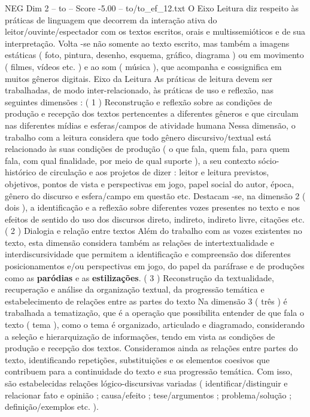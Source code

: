 \begin{textsample}{NEG Dim 2 – to – Score -5.00 – to/to\_ef\_12.txt}  \label{ex:f2_neg_155}
O Eixo Leitura diz respeito às práticas de linguagem que decorrem da interação ativa do leitor/ouvinte/espectador com os textos escritos, orais e multissemióticos e de sua interpretação.
Volta -se não somente ao texto escrito, mas também a imagens estáticas ( foto, pintura, desenho, esquema, gráfico, diagrama ) ou em movimento ( filmes, vídeos etc. ) e ao som ( música ), que acompanha e cossignifica em muitos gêneros digitais.
Eixo da Leitura As práticas de leitura devem ser trabalhadas, de modo inter-relacionado, às práticas de uso e reflexão, nas seguintes dimensões : ( 1 ) Reconstrução e reflexão sobre as condições de produção e recepção dos textos pertencentes a diferentes gêneros e que circulam nas diferentes mídias e esferas/campos de atividade humana Nessa dimensão, o trabalho com a leitura considera que todo gênero discursivo/textual está relacionado às suas condições de produção ( o que fala, quem fala, para quem fala, com qual finalidade, por meio de qual suporte ), a seu contexto sócio-histórico de circulação e aos projetos de dizer : leitor e leitura previstos, objetivos, pontos de vista e perspectivas em jogo, papel social do autor, época, gênero do discurso e esfera/campo em questão etc.
Destacam -se, na dimensão 2 ( dois ), a identificação e a reflexão sobre diferentes vozes presentes no texto e nos efeitos de sentido do uso dos discursos direto, indireto, indireto livre, citações etc. ( 2 ) Dialogia e relação entre textos Além do trabalho com as vozes existentes no texto, esta dimensão considera também as relações de intertextualidade e interdiscursividade que permitem a identificação e compreensão dos diferentes posicionamentos e/ou perspectivas em jogo, do papel da paráfrase e de produções como as \textbf{paródias} e as \textbf{estilizações}. ( 3 ) Reconstrução da textualidade, recuperação e análise da organização textual, da progressão temática e estabelecimento de relações entre as partes do texto Na dimensão 3 ( três ) é trabalhada a tematização, que é a operação que possibilita entender de que fala o texto ( tema ), como o tema é organizado, articulado e diagramado, considerando a seleção e hierarquização de informações, tendo em vista as condições de produção e recepção dos textos.
Consideramos ainda as relações entre partes do texto, identificando repetições, substituições e os elementos coesivos que contribuem para a continuidade do texto e sua progressão temática.
Com isso, são estabelecidas relações lógico-discursivas variadas ( identificar/distinguir e relacionar fato e opinião ; causa/efeito ; tese/argumentos ; problema/solução ; definição/exemplos etc. ).

\end{textsample}
